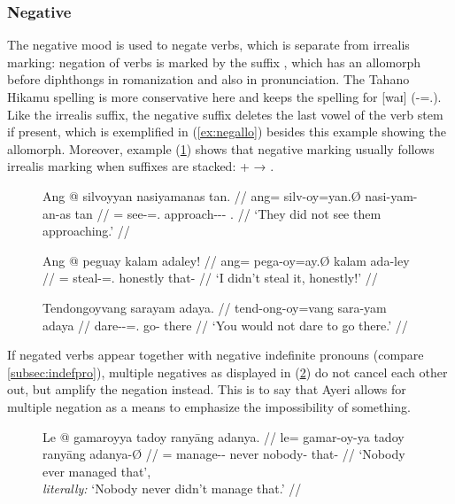 
\subsubsection{Negative}
\label{subsubsec:verbneg}

The negative mood is used to negate verbs, which is separate from irrealis
marking: negation of verbs is marked by the suffix , which has
an allomorph  before diphthongs in romanization and also in
pronunciation. The Tahano Hikamu spelling is more conservative here and keeps
the spelling   for [waɪ]
(\mbox{-\Neg{}=\Fsg{}.\Top{}}). Like the irrealis suffix, the
negative suffix deletes the last vowel of the verb stem if present, which is
exemplified in (\ref{ex:negallo}) besides this example showing the 
allomorph. Moreover, example (\ref{ex:irrneg}) shows that negative marking
usually follows irrealis marking when suffixes are stacked:  +
 → .

\begin{figure}[h]
\pex
\a\label{ex:negative}\begingl
	\gla Ang @ silvoyyan nasiyamanas tan. //
	\glb ang= silv-oy=yan.Ø nasi-yam-an-as tan //
	\glc \AgtT{}= see-\Neg{}=\TplM{}.\Top{} approach-\Ptcp{}-\Nmlz{}-\Parg{} 
		\TplM{}.\Gen{} //
	\glft `They did not see them approaching.' //
\endgl

\a\label{ex:negallo}\begingl
	\gla Ang @ peguay kalam adaley! //
	\glb ang= pega-oy=ay.Ø kalam ada-ley //
	\glc \AgtT{}= steal-\Neg{}=\Fsg{}.\Top{} honestly that-\PargI{} //
	\glft `I didn't steal it, honestly!' //
\endgl

\a\label{ex:irrneg}\begingl
	\gla Tendongoyvang sarayam adaya. //
	\glb tend-ong-oy=vang sara-yam adaya //
	\glc dare-\Irr{}-\Neg{}=\Second{}.\Aarg{} go-\Ptcp{} there //
	\glft `You would not dare to go there.' //
\endgl
\xe
\end{figure}

If negated verbs appear together with negative indefinite pronouns (compare 
\autoref{subsec:indefpro}), multiple negatives as displayed in
(\ref{ex:dblneg}) do not cancel each other out, but amplify the negation
instead. This is to say that Ayeri allows for multiple
negation as a means to emphasize the impossibility of something.

\begin{figure}[h]
\ex\label{ex:dblneg}
\begingl
	\gla Le @ gamaroyya tadoy ranyāng adanya. //
	\glb le= gamar-oy-ya tadoy ranyāng adanya-Ø //
	\glc \PatTI{}= manage-\Neg{}-\TsgM{} never nobody-\Aarg{} that-\Top{} //
	\glft `Nobody ever managed that',\\
		\textit{literally:} `Nobody never didn't manage that.' //
\endgl
\xe
\end{figure}

